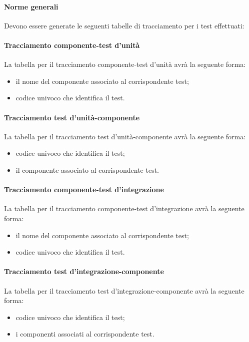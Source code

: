 \paragraph{Norme generali}
Devono essere generate le seguenti tabelle di tracciamento per i test effettuati:

\paragraph{Tracciamento componente-test d'unità}
La tabella per il tracciamento componente-test d'unità avrà la seguente forma:
\begin{itemize}
\item {} il nome del componente associato al corrispondente test;
\item {}codice univoco che identifica il test.
\end{itemize}

\paragraph{Tracciamento test d'unità-componente}
La tabella per il tracciamento test d'unità-componente avrà la seguente forma:
\begin{itemize}
\item {}codice univoco che identifica il test;
\item {} il componente associato al corrispondente test.
\end{itemize}



\paragraph{Tracciamento componente-test d'integrazione}
La tabella per il tracciamento componente-test d'integrazione avrà la seguente forma:
\begin{itemize}
\item {} il nome del componente associato al corrispondente test;
\item {}codice univoco che identifica il test.
\end{itemize}

\paragraph{Tracciamento test d'integrazione-componente}
La tabella per il tracciamento test d'integrazione-componente avrà la seguente forma:
\begin{itemize}
\item {}codice univoco che identifica il test;
\item {} i componenti associati al corrispondente test.
\end{itemize}


